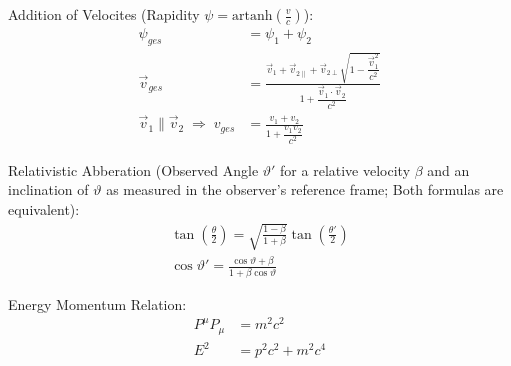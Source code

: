 			\noindent
			Addition of Velocites (Rapidity $\psi = \mathrm{artanh}\left(\frac{v}{c}\right)$):
			\begin{equation}
				\begin{aligned}
					\psi_{ges} &= \psi_1+\psi_2 \\
					\vec{v}_{ges} &= \frac{\vec{v}_1+\vec{v}_{2\parallel}+\vec{v}_{2\perp}\sqrt{1-\dfrac{\vec{v}_1^2}{c^2}}}{1+\dfrac{\vec{v}_1\cdot\vec{v}_2}{c^2}} \\
					\vec{v}_1\parallel\vec{v}_2 \;\Rightarrow\; v_{ges} &= \frac{v_1+v_2}{1+\dfrac{v_1 v_2}{c^2}}
				\end{aligned}
			\end{equation}

			\noindent
			Relativistic Abberation (Observed Angle $\vartheta'$ for a relative velocity $\beta$ and an inclination of $\vartheta$ as measured in the observer's reference frame; Both formulas are equivalent):
			\begin{equation}
				\begin{aligned}
					\tan\left(\frac{\theta}{2}\right) = \sqrt{\frac{1-\beta}{1+\beta}}\tan\left(\frac{\theta'}{2}\right)\\
					\cos\vartheta' = \frac{\cos\vartheta+\beta}{1+\beta\cos\vartheta}
				\end{aligned}
			\end{equation}

			\noindent
			Energy Momentum Relation:
			\begin{equation}
				\begin{aligned}
					P^\mu P_\mu &= m^2 c^2\\
					E^2 &= p^2 c^2 + m^2 c^4 \\
				\end{aligned}
			\end{equation}
			\newpage

